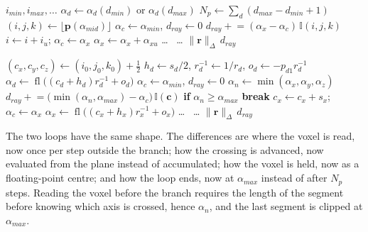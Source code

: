 \documentclass[11pt,a4paper]{article}
\theoremstyle{remark}
\newcommand{\I}{\mathbb{I}}
\newcommand{\fl}{\operatorname{fl}}
\newcommand{\chg}[1]{\textcolor{blue!70!black}{#1}}
\begin{document}
\begin{algorithm}[t]
\caption{\label{alg:both}Jacobs' traversal, Eqs.~\eqref{eq:limpos}--\eqref{eq:jacobs} (left), and the
revised one (right), for one ray after $\alpha_{min}$ and $\alpha_{max}$ are computed. Only the $x$ branch
of the update is written out. Highlighted lines differ. $\alpha_d=\infty$ for an axis with $r_d=0$.}
\begin{minipage}[t]{0.47\linewidth}
\begin{algorithmic}[1]
\State $i_{min},i_{max},\dots$ 
\State $\alpha_d\gets\alpha_d(d_{min})$ or $\alpha_d(d_{max})$ 
\State $N_p\gets\sum_d(d_{max}-d_{min}+1)$
\State $(i,j,k)\gets\lfloor\mathbf p(\alpha_{mid})\rfloor$ 
\State $\alpha_c\gets\alpha_{min}$, $d_{ray}\gets0$
    \State $d_{ray}\mathrel{+}=(\alpha_x-\alpha_c)\,\I(i,j,k)$
    \State $i\gets i+i_u$; $\alpha_c\gets\alpha_x$
    \State $\alpha_x\gets\alpha_x+\alpha_{xu}$
   \dots
  \Else\ \dots
  \EndIf
\EndFor
\State \Return $\|\mathbf r\|_\Delta\,d_{ray}$
\end{algorithmic}
\end{minipage}\hfill
\begin{minipage}[t]{0.51\linewidth}
\begin{algorithmic}[1]
\State \chg{$(c_x,c_y,c_z)\gets(i_0,j_0,k_0)+\tfrac12$} 
\State \chg{$h_d\gets s_d/2$, $r_d^{-1}\gets1/r_d$, $o_d\gets-p_{d1}r_d^{-1}$}
\State \chg{$\alpha_d\gets\fl\big((c_d+h_d)r_d^{-1}+o_d\big)$} 
\State
\State $\alpha_c\gets\alpha_{min}$, $d_{ray}\gets0$
\For{\chg{at most $n_x+n_y+n_z+3$} steps}
  \State \chg{$\alpha_n\gets\min(\alpha_x,\alpha_y,\alpha_z)$}
  \State \chg{$d_{ray}\mathrel{+}=\big(\min(\alpha_n,\alpha_{max})-\alpha_c\big)\,\I(\mathbf c)$}
  \State \chg{\textbf{if} $\alpha_n\ge\alpha_{max}$ \textbf{break}}
    \State \chg{$c_x\gets c_x+s_x$}; $\alpha_c\gets\alpha_x$
    \State \chg{$\alpha_x\gets\fl\big((c_x+h_x)r_x^{-1}+o_x\big)$}
   \dots
  \Else\ \dots
  \EndIf
\EndFor
\State \Return $\|\mathbf r\|_\Delta\,d_{ray}$
\end{algorithmic}
\end{minipage}
\end{algorithm}

The two loops have the same shape. The differences are where the voxel is read, now once per step outside
the branch; how the crossing is advanced, now evaluated from the plane instead of accumulated; how the
voxel is held, now as a floating-point centre; and how the loop ends, now at $\alpha_{max}$ instead of after
$N_p$ steps. Reading the voxel before the branch requires the length of the segment before knowing which
axis is crossed, hence $\alpha_n$, and the last segment is clipped at $\alpha_{max}$.
\end{document}

